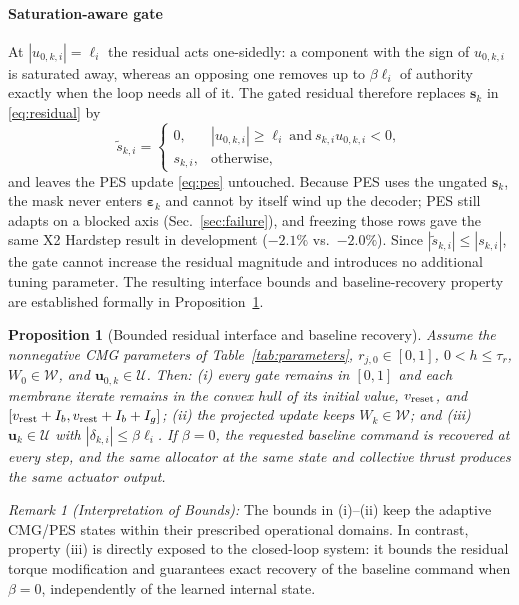 \documentclass[letterpaper, 10 pt, conference]{ieeeconf}
\newtheorem{proposition}{Proposition}
\begin{document}
\paragraph{Saturation-aware gate}
At $|u_{0,k,i}|=\ell_i$ the residual acts one-sidedly: a component with the sign of $u_{0,k,i}$ is saturated away, whereas an opposing one removes up to $\beta\ell_i$ of authority exactly when the loop needs all of it. The gated residual therefore replaces $\bm s_k$ in \eqref{eq:residual} by
\begin{equation}
 \tilde s_{k,i}=\begin{cases}0,&|u_{0,k,i}|\ge\ell_i\ \text{and}\ s_{k,i}u_{0,k,i}<0,\\ s_{k,i},&\text{otherwise,}\end{cases}
 \label{eq:gate}
\end{equation}
and leaves the PES update \eqref{eq:pes} untouched. Because PES uses the ungated $\bm s_k$, the mask never enters $\bm\varepsilon_k$ and cannot by itself wind up the decoder; PES still adapts on a blocked axis (Sec.~\ref{sec:failure}), and freezing those rows gave the same X2 Hardstep result in development ($-2.1\%$ vs.\ $-2.0\%$). Since $|\tilde{s}_{k,i}| \le |s_{k,i}|$, the gate cannot increase
 the residual magnitude and introduces no additional tuning parameter.
 The resulting interface bounds and baseline-recovery property are
 established formally in Proposition~\ref{prop:bounded}.

\begin{proposition}[Bounded residual interface and baseline recovery]\label{prop:bounded}
Assume the nonnegative CMG parameters of Table~\ref{tab:parameters}, $r_{j,0}\in[0,1]$, $0<h\le\tau_r$, $W_0\in\mathcal W$, and $\bm u_{0,k}\in\mathcal U$. Then: (i) every gate remains in $[0,1]$ and each membrane iterate remains in the convex hull of its initial value, $v_{\rm reset}$, and $[v_{\rm rest}+I_b,v_{\rm rest}+I_b+I_g]$; (ii) the projected update keeps $W_k\in\mathcal W$; and (iii) $\bm u_k\in\mathcal U$ with $|\delta_{k,i}|\le\beta\ell_i$. If $\beta=0$, the requested baseline command is recovered at every step, and the same allocator at the same state and collective thrust produces the same actuator output.
\end{proposition}

\textit{Remark 1 (Interpretation of Bounds):}
The bounds in (i)--(ii) keep the adaptive CMG/PES states within their
prescribed operational domains. In contrast, property (iii) is directly
exposed to the closed-loop system: it bounds the residual torque
modification and guarantees exact recovery of the baseline command when
$\beta=0$, independently of the learned internal state.
\end{document}

